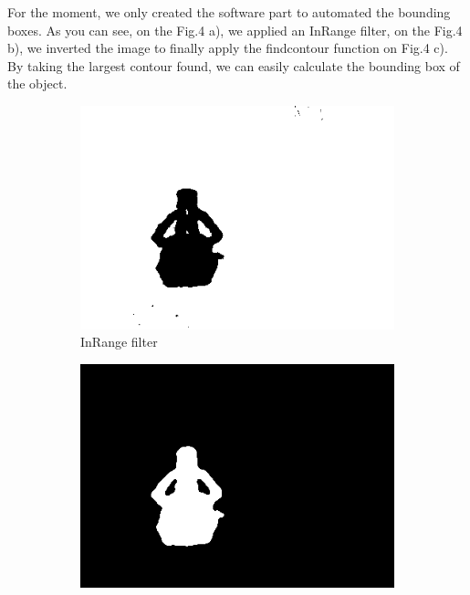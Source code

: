 \documentclass[runningheads,a4paper]{llncs}
\begin{document}
For the moment, we only created the software part to automated the bounding boxes. As you can see, on the Fig.4 a), we applied an InRange filter, on the Fig.4 b), we inverted the image to finally apply the findcontour function on Fig.4 c). By taking the largest contour found, we can easily calculate the bounding box of the object.  \\
 
\begin{figure}[h!]
  \centering
  \begin{subfigure}[b]{0.3\linewidth}
    \includegraphics[width=\linewidth]{images/bounding_inrange.png}
    \caption{InRange filter}
  \end{subfigure}
  \begin{subfigure}[b]{0.3\linewidth}
    \includegraphics[width=\linewidth]{images/bounding_invert.png}

\end{subfigure}
\end{figure}
\end{document}

